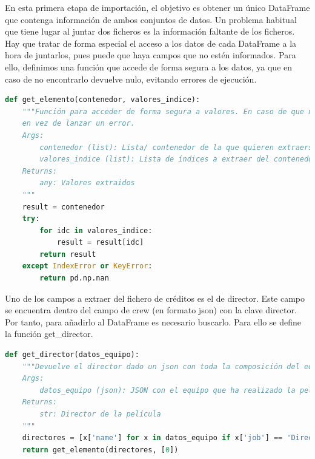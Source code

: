 En esta primera etapa de importación, el objetivo es obtener un único DataFrame que contenga información de ambos conjuntos de datos. Un problema habitual que tiene lugar al juntar dos ficheros es la información faltante de los ficheros. Hay que tratar de forma especial el acceso a los datos de cada DataFrame a la hora de juntarlos, pues puede que haya campos que no estén informados. Para ello, definimos una función que accede de forma segura a los datos, ya que en caso de no encontrarlo devuelve nulo, evitando errores de ejecución.

\begin{lstlisting}[language=Python, caption={Acceso a los datos de forma segura. Se utiliza como proxy para no acceder directamente al valor. De esta forma, si se da un error, en vez de tener un error de ejecución se devuelve nulo.}]
def get_elemento(contenedor, valores_indice):
    """Función para acceder de forma segura a valores. En caso de que no se encuentre uno de ellos, se devuelve NaN
    en vez de lanzar un error.
    Args:
        contenedor (list): Lista/ contenedor de la que quieren extraerse los valores
        valores_indice (list): Lista de índices a extraer del contenedor
    Returns:
        any: Valores extraidos
    """
    result = contenedor
    try:
        for idc in valores_indice:
            result = result[idc]
        return result
    except IndexError or KeyError:
        return pd.np.nan
\end{lstlisting}

Uno de los campos a extraer del fichero de créditos es el de director. Este campo se encuentra dentro del campo de crew (en formato json) con la clave director. Por tanto, para añadirlo al DataFrame es necesario buscarlo. Para ello se define la función get\_director.
\begin{lstlisting}[language=Python, caption= {Obtención de una lista de directores extraidos del campo crew. Se itera por todos los miembros del equipo y se retienen unicamente aquellos que tienen el cargo de director.}]
def get_director(datos_equipo):
    """Devuelve el director dado un json con toda la composición del equipo de la película.
    Args:
        datos_equipo (json): JSON con el equipo que ha realizado la película
    Returns:
        str: Director de la película
    """
    directores = [x['name'] for x in datos_equipo if x['job'] == 'Director']
    return get_elemento(directores, [0])
\end{lstlisting}

